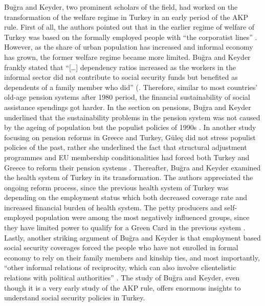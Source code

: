 \documentclass[11pt]{article}
\begin{document}
\noindent Buğra and Keyder, two prominent scholars of the field, had worked on the transformation of the welfare regime in Turkey in an early period of the AKP rule. First of all, the authors pointed out that in the earlier regime of welfare of Turkey was based on the formally employed people with “the corporatist lines” \cite{buugra2006turkish}. However, as the share of urban population has increased and informal economy has grown, the former welfare regime became more limited. Buğra and Keyder frankly stated that “[…] dependency ratios increased as the workers in the informal sector did not contribute to social security funds but benefited as dependents of a family member who did” (\cite{buugra2006turkish}. Therefore, similar to most countries’ old-age pension systems after 1980 period, the financial sustainability of social assistance spendings got harder. In the section on pensions, Buğra and Keyder underlined that the sustainability problems in the pension system was not caused by the ageing of population but the populist policies of 1990s \cite{buugra2006turkish}. In another study focusing on pension reforms in Greece and Turkey, Güleç did not stress populist policies of the past, rather she underlined the fact that structural adjustment programmes and EU membership conditionalities had forced both Turkey and Greece to reform their pension systems \cite{gulecc2014politics}. Thereafter, Buğra and Keyder examined the health system of Turkey in its transformation. The authors appreciated the ongoing reform process, since the previous health system of Turkey was depending on the employment status which both decreased coverage rate and increased financial burden of health system. The petty producers and self-employed population were among the most negatively influenced groups, since they have limited power to qualify for a Green Card in the previous system \cite{buugra2006turkish}. Lastly, another striking argument of Buğra and Keyder is that employment based social security coverages forced the people who have not enrolled in formal economy to rely on their family members and kinship ties, and most importantly, “other informal relations of reciprocity, which can also involve clientelistic relations with political authorities” \cite{buugra2006turkish}. The study of Buğra and Keyder, even though it is a very early study of the AKP rule, offers enormous insights to understand social security policies in Turkey. \\
\end{document}
